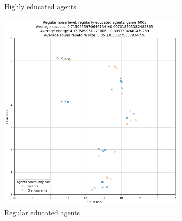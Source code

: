 \begin{figure}[ht]
\begin{subfigure}{.30\textwidth}
        \captionsetup{width=0.9\linewidth}
        \captionsetup{justification=centering}
        \caption{Highly educated agents}
    \end{subfigure}
    \hspace{0.5cm}
    \begin{subfigure}{.30\textwidth}
        \centering
        \includegraphics[width=\textwidth]{images/results/noise_std_regular.png}
        \captionsetup{width=0.9\linewidth}
        \captionsetup{justification=centering}
        \caption{Regular educated agents}
    \end{subfigure}
    \begin{subfigure}{.30\textwidth}
        \centering

\end{subfigure}
\end{figure}
